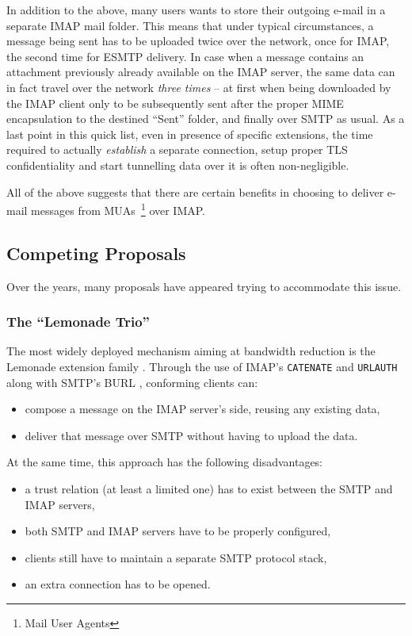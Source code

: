 \documentclass[trojita]{subfiles}
\begin{document}
In addition to the above, many users wants to store their outgoing e-mail in a separate IMAP mail folder.  This means
that under typical circumstances, a message being sent has to be uploaded twice over the network, once for IMAP, the
second time for ESMTP delivery.  In case when a message contains an attachment previously already available on the IMAP
server, the same data can in fact travel over the network {\em three times} -- at first when being downloaded by the
IMAP client only to be subsequently sent after the proper MIME encapsulation to the destined ``Sent'' folder, and
finally over SMTP as usual.  As a last point in this quick list, even in presence of specific extensions, the time
required to actually {\em establish} a separate connection, setup proper TLS confidentiality and start tunnelling data
over it is often non-negligible.

All of the above suggests that there are certain benefits in choosing to deliver e-mail messages from
MUAs~\footnote{Mail User Agents} over IMAP.

\subsection{Competing Proposals}

Over the years, many proposals have appeared trying to accommodate this issue.

\subsubsection{The ``Lemonade Trio''}

The most widely deployed mechanism aiming at bandwidth reduction is the Lemonade extension family \cite{rfc5550}.
Through the use of IMAP's {\tt CATENATE} \cite{rfc4469} and {\tt URLAUTH} \cite{rfc4467} along with SMTP's BURL
\cite{rfc4468}, conforming clients can:

\begin{itemize}
  \item compose a message on the IMAP server's side, reusing any existing data,
  \item deliver that message over SMTP without having to upload the data.
\end{itemize}

At the same time, this approach has the following disadvantages:

\begin{itemize}
  \item a trust relation (at least a limited one) has to exist between the SMTP and IMAP servers,
  \item both SMTP and IMAP servers have to be properly configured,
  \item clients still have to maintain a separate SMTP protocol stack,
  \item an extra connection has to be opened.
\end{itemize}
\end{document}
